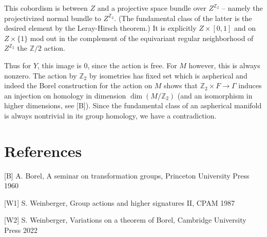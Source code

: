 \documentclass{article}
\begin{document}
This cobordism is between $Z$ and a projective space bundle over $Z^{\mathbb{Z}_2}$ -- namely the projectivized normal bundle to $Z^{\mathbb{Z}_2}$. (The fundamental class of the latter is the desired element by the Leray-Hirsch theorem.) It is explicitly $Z \times [0,1]$ and on $Z \times \{1\}$ mod out in the complement of the equivariant regular neighborhood of $Z^{\mathbb{Z}_2}$ the $\mathbb{Z}/2$ action.

Thus for $Y$, this image is 0, since the action is free. For $M$ however, this is always nonzero. The action by $\mathbb{Z}_{2}$ by isometries has fixed set which is aspherical and indeed the Borel construction for the action on $M$ shows that $\mathbb{Z}_{2}\times F \to \Gamma$ induces an injection on homology in dimension $\dim(M/\mathbb{Z}_{2})$ (and an isomorphism in higher dimensions, see [B]). Since the fundamental class of an aspherical manifold is always nontrivial in its group homology, we have a contradiction.

\section*{References}

[B] A. Borel, A seminar on transformation groups, Princeton University Press 1960

[W1] S. Weinberger, Group actions and higher signatures II, CPAM 1987

[W2] S. Weinberger, Variations on a theorem of Borel, Cambridge University Press 2022
\end{document}
